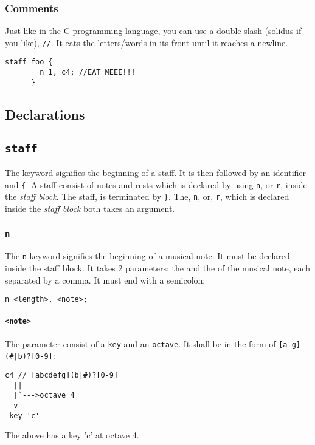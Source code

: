 \subsubsection{Comments}
\np Just like in the C programming language, you can use a double slash (solidus if you like), \verb+//+.
It eats the letters/words in its front until it reaches a newline.
\begin{Verbatim}[frame=single]
      staff foo {
        n 1, c4; //EAT MEEE!!!
      }
\end{Verbatim}

\subsection{Declarations}

\subsection{\texttt{staff}}
\np The  keyword signifies the beginning of a staff. It is then followed by an identifier and \verb+{+. A staff consist of
notes and rests which is declared by using \verb+n+, or \verb+r+, inside the \textit{staff block}.
The staff, is terminated by \verb+}+. The, \verb+n+, or, \verb+r+, which is declared inside the \textit{staff block} both takes an argument.

\subsubsection{\texttt{n}}

\np The \verb+n+ keyword signifies the beginning of a musical note. It must be declared
inside the staff block.
It takes 2 parameters; the  and the  of the
musical note, each separated by a comma. It must end with a semicolon: 

\begin{Verbatim}[frame=single]
      n <length>, <note>;
\end{Verbatim}

\paragraph{\texttt{<note>}} The parameter  consist of a \verb+key+ and an \verb+octave+. It shall be in the form of \verb+[a-g](#|b)?[0-9]+:

\begin{Verbatim}[frame=single]
  c4 // [abcdefg](b|#)?[0-9]
  ||
  |`--->octave 4
  v
 key 'c'
\end{Verbatim}
The above has a key 'c' at octave 4.

